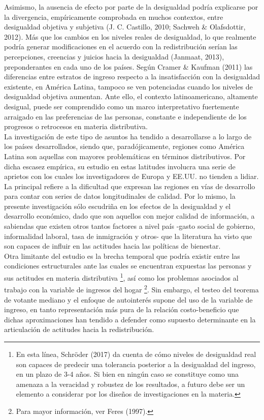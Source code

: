 \documentclass[12pt,letterpaper]{article}
\begin{document}
Asimismo, la ausencia de efecto por parte de la desigualdad podría explicarse por la divergencia, empíricamente comprobada en muchos contextos, entre desigualdad objetiva y subjetiva (J. C. Castillo, 2010; Sachweh \& Olafsdottir, 2012). Más que los cambios en los niveles reales de desigualdad, lo que realmente podría generar modificaciones en el acuerdo con la redistribución serían las percepciones, creencias y juicios hacia la desigualdad (Janmaat, 2013), preponderantes en cada uno de los países. Según Cramer \& Kaufman (2011) las diferencias entre estratos de ingreso respecto a la insatisfacción con la desigualdad existente, en América Latina, tampoco se ven potenciadas cuando los niveles de desigualdad objetiva aumentan. Ante ello, el contexto latinoamericano, altamente desigual, puede ser comprendido como un marco interpretativo fuertemente arraigado en las preferencias de las personas, constante e independiente de los progresos o retrocesos en materia distributiva. \\

La investigación de este tipo de asuntos ha tendido a desarrollarse a lo largo de los países desarrollados, siendo que, paradójicamente, regiones como América Latina son aquellas con mayores problemáticas en términos distributivos. Por dicha escasez empírica, su estudio en estas latitudes involucra una serie de aprietos con los cuales los investigadores de Europa y EE.UU. no tienden a lidiar. La principal refiere a la dificultad que expresan las regiones en vías de desarrollo para contar con series de datos longitudinales de calidad. Por lo mismo, la presente investigación sólo escudriña en los efectos de la desigualdad y el desarrollo económico, dado que son aquellos con mejor calidad de información, a sabiendas que existen otros tantos factores a nivel país -gasto social de gobierno, informalidad laboral, tasa de inmigración y otros- que la literatura ha visto que son capaces de influir en las actitudes hacia las políticas de bienestar. \\

Otra limitante del estudio es la brecha temporal que podría existir entre las condiciones estructurales ante las cuales se encuentran expuestas las personas y sus actitudes en materia distributiva \footnote{En esta línea, Schröder (2017) da cuenta de cómo niveles de desigualdad real son capaces de predecir una tolerancia posterior a la desigualdad del ingreso, en un plazo de 3-4 años. Si bien en ningún caso se constituye como una amenaza a la veracidad y robustez de los resultados, a futuro debe ser un elemento a considerar por los diseños de investigaciones en la materia.}, así como los problemas asociados al trabajo con la variable de ingresos del hogar \footnote{Para mayor información, ver Feres (1997).}. Sin embargo, el testeo del teorema de votante mediano y el enfoque de autointerés supone del uso de la variable de ingreso, en tanto representación más pura de la relación costo-beneficio que dichas aproximaciones han tendido a defender como supuesto determinante en la articulación de actitudes hacia la redistribución.\\
 
\end{document}
